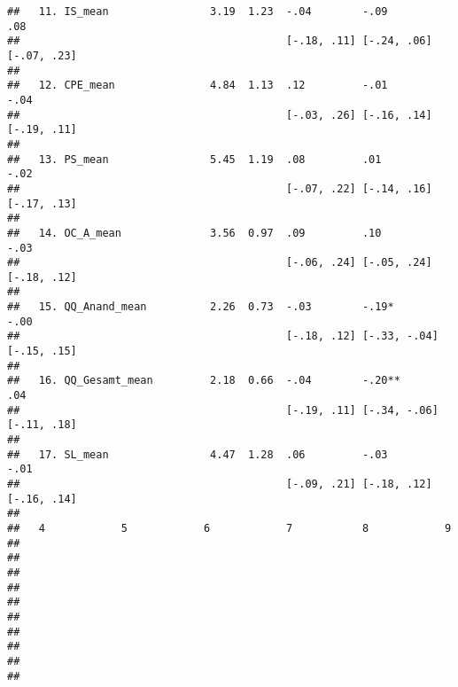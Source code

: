 \documentclass[
]{article}
\begin{document}
\begin{verbatim}
##   11. IS_mean                3.19  1.23  -.04        -.09         .08         
##                                          [-.18, .11] [-.24, .06]  [-.07, .23] 
##                                                                               
##   12. CPE_mean               4.84  1.13  .12         -.01         -.04        
##                                          [-.03, .26] [-.16, .14]  [-.19, .11] 
##                                                                               
##   13. PS_mean                5.45  1.19  .08         .01          -.02        
##                                          [-.07, .22] [-.14, .16]  [-.17, .13] 
##                                                                               
##   14. OC_A_mean              3.56  0.97  .09         .10          -.03        
##                                          [-.06, .24] [-.05, .24]  [-.18, .12] 
##                                                                               
##   15. QQ_Anand_mean          2.26  0.73  -.03        -.19*        -.00        
##                                          [-.18, .12] [-.33, -.04] [-.15, .15] 
##                                                                               
##   16. QQ_Gesamt_mean         2.18  0.66  -.04        -.20**       .04         
##                                          [-.19, .11] [-.34, -.06] [-.11, .18] 
##                                                                               
##   17. SL_mean                4.47  1.28  .06         -.03         -.01        
##                                          [-.09, .21] [-.18, .12]  [-.16, .14] 
##                                                                               
##   4            5            6            7           8            9           
##                                                                               
##                                                                               
##                                                                               
##                                                                               
##                                                                               
##                                                                               
##                                                                               
##                                                                               
##                                                                               
##                                                                               

\end{verbatim}
\end{document}
